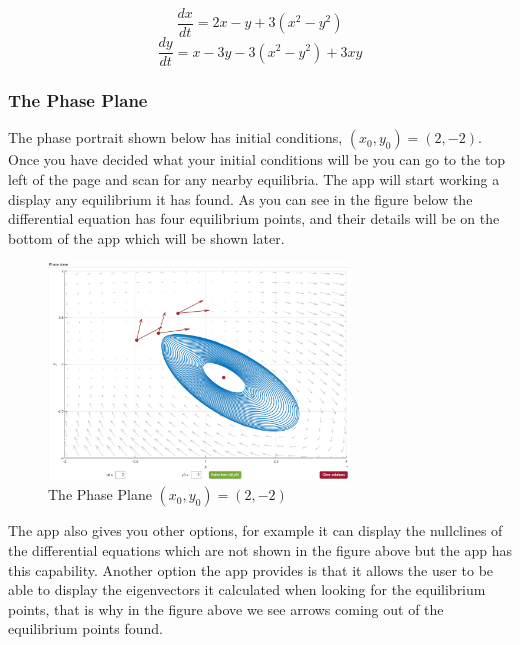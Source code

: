 \documentclass[a4paper,10pt]{article}
\begin{document}
\begin{displaymath}
 \frac{dx}{dt} = 2x-y+3(x^2-y^2)
\end{displaymath}
\begin{displaymath}
\frac{dy}{dt} = x-3y-3(x^2-y^2)+3xy
\end{displaymath}
\subsubsection{The Phase Plane}
The phase portrait shown below has initial conditions, $(x_0,y_0) = (2,-2)$. Once you have decided what your initial conditions will be you can go to the top left of the page and scan for any nearby equilibria. The app will start working a display any equilibrium it has found. As you can see in the figure below the differential equation has four equilibrium points, and their details will be on the bottom of the app which will be shown later.
\begin{figure}[H]
	\centering
	\includegraphics[width=  8cm]{Project_App_1.png}
	\caption{The Phase Plane $(x_0,y_0) = (2,-2)$}
\end{figure}
The app also gives you other options, for example it can display the nullclines of the differential equations which are not shown in the figure above but the app has this capability. Another option the app provides is that it allows the user to be able to display the eigenvectors it calculated when looking for the equilibrium points, that is why in the figure above we see arrows coming out of the equilibrium points found. 
\end{document}

